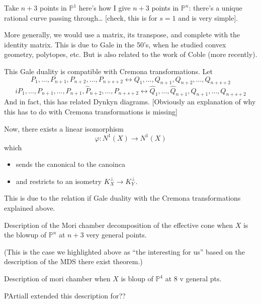 \begin{example}
\label{example-gale-s-equal-1}
Take $n+3$ points in $\mathbb{P}^1$
here's how I give $n+3$
points in $\mathbb{P}^n$:
there's a unique rational curve passing
through… [check, this is for $s=1$
and is very simple].
\end{example}

\noindent
More generally, we would use a matrix,
its transpose, and complete with
the identity matrix.
This is due to Gale in the 50's,
when he studied convex geometry, polytopes,
etc. But is also related to the work
of Coble (more recently).

This Gale duality is compatible with
Cremona transformations.
Let 
$$
P_1,…,P_{n+1}, P_{n+2},…, P_{n+s+2}
\leftrightarrow
Q_1,…,Q_{n+1},Q_{n+2},…,
Q_{n+s+2}
$$
$$
iP_1,…,P_{n+1},…,P_{n+1},
\hat{P}_{n+2},…,
\hat{P}_{n+s+2}
\leftrightarrow
\hat{Q}_1,…,\hat{Q}_{n+1}
,Q_{n+1},…,Q_{n+s+2}
$$
And in fact, this has related
Dynkyn diagrams. [Obviously
an explanation of why this has
to do with Cremona transformations is 
missing]

\medskip\noindent
Now, there exists a linear isomorphism
$$
\varphi:N^1(X) \to N^1(X)
$$
which
\begin{itemize}
\item sends the canonical to the canoinca
\item  and restricts to an isometry
$K^\perp_X \to K^\perp_Y$.
\end{itemize}

\noindent
This is due to the relation
if Gale duality with
the Cremona transformations
explained above.

\begin{theorem}
\label{theorem-}
Description of the Mori chamber
decomposition of the effective cone
when $X$ is the blowup of $\mathbb{P}^n$
at $n+3$ very general points.
\end{theorem}

\noindent
(This is the case we highlighted
above as ``the interesting for us''
based on the description
of the MDS there exist theorem.)

\begin{theorem}
\label{theorem-duplicate-2}
Description of mori chamber when $X$ is bloup
of $\mathbb{P}^4$ at $8$ v general pts.
\end{theorem}

\begin{theorem}
\label{theorem-duplicate-3}
PArtiall extended this description for??
\end{theorem}

